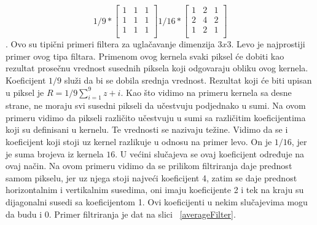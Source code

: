 \documentclass[a4paper,12pt,titlepage]{article}
\begin{document}
\[
1/9
*
\begin{bmatrix}
1 & 1 & 1 \\
1 & 1 & 1 \\
1 & 1 & 1 \\
\end{bmatrix}
1/16
*
\begin{bmatrix}
1 & 2 & 1 \\
2 & 4 & 2 \\
1 & 2 & 1 \\
\end{bmatrix}
\]. 
Ovo su tipični primeri filtera za uglačavanje dimenzija $3 x 3$. Levo je najprostiji primer ovog tipa filtara. Primenom ovog kernela svaki piksel će dobiti kao rezultat prosečnu vrednost susednih piksela koji odgovaraju obliku ovog kernela. Koeficijent $1/9$ služi da bi se dobila srednja vrednost. Rezultat koji će biti upisan u piksel je $R = 1/9 \sum_{i = 1}^{9} z+{i}$. Kao što vidimo na primeru kernela sa desne strane, ne moraju svi susedni pikseli da učestvuju podjednako u sumi. Na ovom primeru vidimo da pikseli različito učestvuju u sumi sa različitim koeficijentima koji su definisani u kernelu. Te vrednosti se nazivaju težine. Vidimo da se i koeficijent koji stoji uz kernel razlikuje u odnosu na primer levo. On je $1/16$, jer je suma brojeva iz kernela $16$. U većini slučajeva se ovaj koeficijent određuje na ovaj način. Na ovom primeru vidimo da se prilikom filtriranja daje prednost samom pikselu, jer uz njega stoji najveći koeficijent 4, zatim se daje prednost horizontalnim i vertikalnim susedima, oni imaju koeficijente 2 i tek na kraju su dijagonalni susedi sa koeficijentom 1. Ovi koeficijenti u nekim slučajevima mogu da budu i 0. Primer filtriranja je dat na slici ~\ref{averageFilter}.
\end{document}
